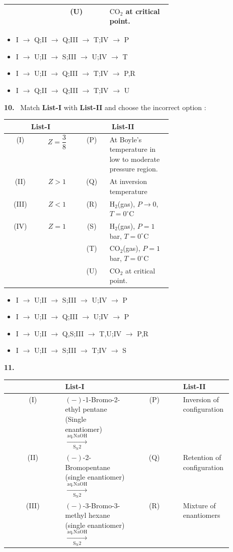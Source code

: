 \documentclass[10pt]{extarticle}
\newcommand{\qn}[1]{\par\smallskip\noindent\textbf{#1.}~}
\newenvironment{qoptions}{\begin{itemize}[leftmargin=1.8em,itemsep=1pt,topsep=2pt,label={}]}{\end{itemize}}
\newcommand{\opt}[2]{\item[(#1)] #2}
\begin{document}
\begin{multicols}{2}
{\begin{tabular}{|c|c|c|p{0.38\linewidth}|}
 & & (U) & $\mathrm{CO_2}$ at critical point.\\ \hline
\end{tabular}}
\begin{qoptions}
\opt{A}{I $\to$ Q;II $\to$ Q;III $\to$ T;IV $\to$ P}
\opt{B}{I $\to$ U;II $\to$ S;III $\to$ U;IV $\to$ T}
\opt{C}{I $\to$ U;II $\to$ Q;III $\to$ T;IV $\to$ P,R}
\opt{D}{I $\to$ Q;II $\to$ Q;III $\to$ T;IV $\to$ U}
\end{qoptions}
\qn{10} Match \textbf{List-I} with \textbf{List-II} and choose the incorrect option :\par
{\footnotesize\setlength{\tabcolsep}{2pt}\begin{tabular}{|c|c|c|p{0.38\linewidth}|}
\hline
\multicolumn{2}{|c|}{\textbf{List-I}} & \multicolumn{2}{c|}{\textbf{List-II}}\\ \hline
(I) & $Z=\dfrac38$ & (P) & At Boyle's temperature in low to moderate pressure region.\\ \hline
(II) & $Z>1$ & (Q) & At inversion temperature\\ \hline
(III) & $Z<1$ & (R) & $\mathrm{H_2}$(gas), $P\to0$, $T=0^\circ$C\\ \hline
(IV) & $Z=1$ & (S) & $\mathrm{H_2}$(gas), $P=1$ bar, $T=0^\circ$C\\ \hline
 & & (T) & $\mathrm{CO_2}$(gas), $P=1$ bar, $T=0^\circ$C\\ \hline
 & & (U) & $\mathrm{CO_2}$ at critical point.\\ \hline
\end{tabular}}
\begin{qoptions}
\opt{A}{I $\to$ U;II $\to$ S;III $\to$ U;IV $\to$ P}
\opt{B}{I $\to$ U;II $\to$ Q;III $\to$ U;IV $\to$ P}
\opt{C}{I $\to$ U;II $\to$ Q,S;III $\to$ T,U;IV $\to$ P,R}
\opt{D}{I $\to$ U;II $\to$ S;III $\to$ T;IV $\to$ S}
\end{qoptions}
\qn{11} {\footnotesize\setlength{\tabcolsep}{2pt}\begin{tabular}{|c|p{0.3\linewidth}|c|p{0.22\linewidth}|}
\hline
 & \centering\textbf{List-I} & & \textbf{List-II}\\ \hline
(I) & $(-)$-1-Bromo-2-ethyl pentane (Single enantiomer) $\xrightarrow[\mathrm{S_N2}]{\mathrm{aq.NaOH}}$ & (P) & Inversion of configuration\\ \hline
(II) & $(-)$-2-Bromopentane (single enantiomer) $\xrightarrow[\mathrm{S_N2}]{\mathrm{aq.NaOH}}$ & (Q) & Retention of configuration\\ \hline
(III) & $(-)$-3-Bromo-3-methyl hexane (single enantiomer) $\xrightarrow[\mathrm{S_N2}]{\mathrm{aq.NaOH}}$ & (R) & Mixture of enantiomers\\ \hline

\end{tabular}}
\end{multicols}
\end{document}
